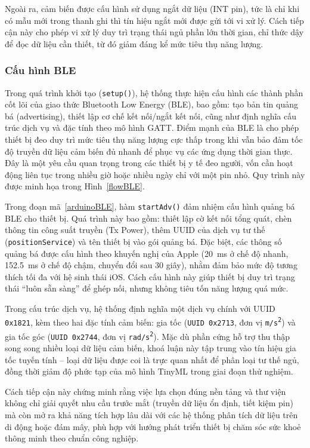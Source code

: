 Ngoài ra, cảm biến được cấu hình sử dụng ngắt dữ liệu (INT pin), tức là chỉ khi có mẫu mới trong thanh ghi thì tín hiệu ngắt mới được gửi tới vi xử lý. Cách tiếp cận này cho phép vi xử lý duy trì trạng thái ngủ phần lớn thời gian, chỉ thức dậy để đọc dữ liệu cần thiết, từ đó giảm đáng kể mức tiêu thụ năng lượng.

\subsubsection{Cấu hình BLE}

Trong quá trình khởi tạo (\texttt{setup()}), hệ thống thực hiện cấu hình 
các thành phần cốt lõi của giao thức Bluetooth Low Energy (BLE), bao gồm: 
tạo bản tin quảng bá (advertising), thiết lập cơ chế kết nối/ngắt kết nối, 
cũng như định nghĩa cấu trúc dịch vụ và đặc tính theo mô hình \gls{GATT}. 
Điểm mạnh của BLE là cho phép thiết bị đeo duy trì mức tiêu thụ năng lượng 
cực thấp trong khi vẫn bảo đảm tốc độ truyền dữ liệu cảm biến đủ nhanh để 
phục vụ các ứng dụng thời gian thực. Đây là một yêu cầu quan trọng trong 
các thiết bị y tế đeo người, vốn cần hoạt động liên tục trong nhiều giờ 
hoặc nhiều ngày chỉ với một pin nhỏ. Quy trình này được minh họa trong 
Hình~\ref{flowBLE}.  

Trong đoạn mã~\ref{arduinoBLE}, hàm \texttt{startAdv()} đảm nhiệm cấu 
hình quảng bá BLE cho thiết bị. Quá trình này bao gồm: thiết lập cờ 
kết nối tổng quát, chèn thông tin công suất truyền (Tx Power), thêm UUID 
của dịch vụ tư thế (\texttt{positionService}) và tên thiết bị vào gói quảng bá. 
Đặc biệt, các thông số quảng bá được cấu hình theo khuyến nghị của Apple 
(20~ms ở chế độ nhanh, 152.5~ms ở chế độ chậm, chuyển đổi sau 30 giây), 
nhằm đảm bảo mức độ tương thích tối đa với hệ sinh thái iOS. Cách cấu hình 
này giúp thiết bị duy trì trạng thái “luôn sẵn sàng” để ghép nối, nhưng 
không tiêu tốn năng lượng quá mức.  

Trong cấu trúc dịch vụ, hệ thống định nghĩa một dịch vụ chính với UUID 
\texttt{0x1821}, kèm theo hai đặc tính cảm biến: gia tốc 
(\texttt{UUID 0x2713}, đơn vị \texttt{m/s\textsuperscript{2}}) và 
gia tốc góc (\texttt{UUID 0x2744}, đơn vị \texttt{rad/s\textsuperscript{2}}). 
Mặc dù phần cứng hỗ trợ thu thập song song nhiều loại dữ liệu cảm biến, 
khoá luận này tập trung vào tín hiệu gia tốc tuyến tính – loại dữ liệu 
được coi là trực quan nhất để phân loại tư thế ngủ, đồng thời giảm độ phức 
tạp của mô hình TinyML trong giai đoạn thử nghiệm.  

Cách tiếp cận này chứng minh rằng việc lựa chọn đúng nền tảng và thư viện 
không chỉ giải quyết nhu cầu trước mắt (truyền dữ liệu ổn định, tiết kiệm pin) 
mà còn mở ra khả năng tích hợp lâu dài với các hệ thống phân tích dữ liệu 
trên di động hoặc đám mây, phù hợp với hướng phát triển thiết bị chăm sóc 
sức khoẻ thông minh theo chuẩn công nghiệp.

